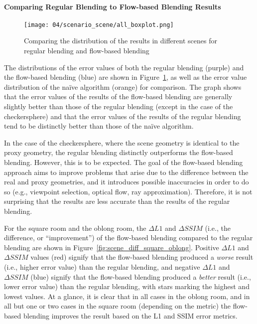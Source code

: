 \paragraph{Comparing Regular Blending to Flow-based Blending Results}

\begin{figure}
		\centering
		\texttt{[image: 04/scenario\_scene/all\_boxplot.png]}
		\caption[The distribution of results in different scenes]{Comparing the distribution of the results in different scenes for regular blending and flow-based blending}
		\label{fig:scenario_scene_boxplot}
\end{figure}

The distributions of the error values of both the regular blending (purple) and the flow-based blending (blue) are shown in Figure~\ref{fig:scenario_scene_boxplot}, as well as the error value distribution of the na\"ive algorithm (orange) for comparison\footnotemark. The graph shows that the error values of the results of the flow-based blending are generally slightly better than those of the regular blending (except in the case of the checkersphere) and that the error values of the results of the regular blending tend to be distinctly better than those of the na\"ive algorithm. 

In the case of the checkersphere, where the scene geometry is identical to the proxy geometry, the regular blending distinctly outperforms the flow-based blending. However, this is to be expected. The goal of the flow-based blending approach aims to improve problems that arise due to the difference between the real and proxy geometries, and it introduces possible inaccuracies in order to do so (e.g., viewpoint selection, optical flow, ray approximation). Therefore, it is not surprising that the results are less accurate than the results of the regular blending.

For the square room and the oblong room, the $\Delta L1$ and $\Delta SSIM$ (i.e., the difference, or ``improvement'') of the flow-based blending compared to the regular blending are shown in Figure~\ref{fig:scene_diff_square_oblong}. Positive $\Delta L1$ and $\Delta SSIM$ values (red) signify that the flow-based blending produced a \emph{worse} result (i.e., higher error value) than the regular blending, and negative $\Delta L1$ and $\Delta SSIM$ (blue) signify that the flow-based blending produced a \emph{better} result (i.e., lower error value) than the regular blending, with stars marking the highest and lowest values. At a glance, it is clear that in all cases in the oblong room, and in all but one or two cases in the square room (depending on the metric) the flow-based blending improves the result based on the L1 and SSIM error metrics.

